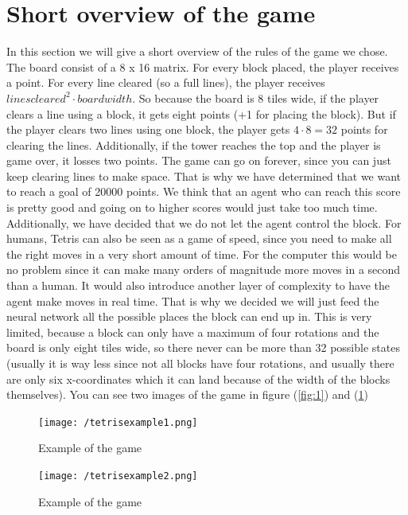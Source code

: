 \documentclass{report}
\begin{document}
\section{Short overview of the game}
In this section we will give a short overview of the rules of the game we chose.\\
The board consist of a 8 x 16 matrix. For every block placed, the player receives a point. For every line cleared (so a full lines), the player receives $lines cleared^2 \cdot board width$. So because the board is 8 tiles wide, if the player clears a line using a block, it gets eight points (+1 for placing the block). But if the player clears two lines using one block, the player gets $4\cdot8 = 32$ points for clearing the lines. Additionally, if the tower reaches the top and the player is game over, it losses two points. The game can go on forever, since you can just keep clearing lines to make space. That is why we have determined that we want to reach a goal of 20000 points. We think that an agent who can reach this score is pretty good and going on to higher scores would just take too much time.
Additionally, we have decided that we do not let the agent control the block. For humans, Tetris can also be seen as a game of speed, since you need to make all the right moves in a very short amount of time. For the computer this would be no problem since it can make many orders of magnitude more moves in a second than a human. It would also introduce another layer of complexity to have the agent make moves in real time. That is why we decided we will just feed the neural network all the possible places the block can end up in. This is very limited, because a block can only have a maximum of four rotations and the board is only eight tiles wide, so there never can be more than 32 possible states (usually it is way less since not all blocks have four rotations, and usually there are only six x-coordinates which it can land because of the width of the blocks themselves). You can see two images of the game in figure (\ref{fig:1}) and (\ref{fig:2})
\begin{figure}[h!]
	\centering
	\begin{minipage}[t]{0.45\textwidth}
   		\texttt{[image: /tetrisexample1.png]}
    	\caption{Example of the game}
    	\label{fig:1}
 	\end{minipage}
  	\begin{minipage}[t]{0.45\textwidth}
    	 \texttt{[image: /tetrisexample2.png]}
    	\caption{Example of the game}
    	\label{fig:2}
 	\end{minipage}
\end{figure}
\end{document}
